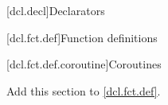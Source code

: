
[dcl.decl]{Declarators}

\setcounter{section}{3}
\setcounter{subsection}{4}

%

\setcounter{section}{3}
[dcl.fct.def]{Function definitions}

\setcounter{subsection}{3}
[dcl.fct.def.coroutine]{Coroutines}

Add this section to \ref{dcl.fct.def}.

